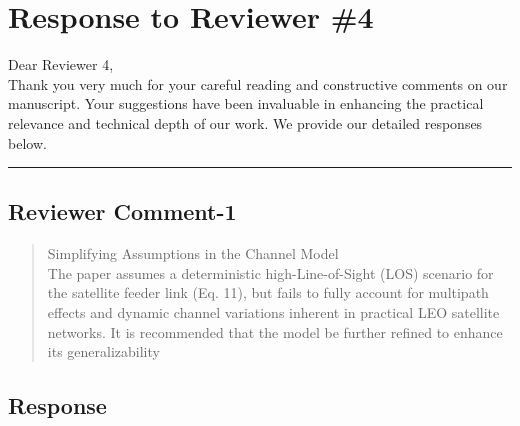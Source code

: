 \section{Response to Reviewer \#4}

Dear Reviewer 4,\\

Thank you very much for your careful reading and constructive comments on our manuscript. Your suggestions have been invaluable in enhancing the practical relevance and technical depth of our work. We provide our detailed responses below.

\noindent\rule{17cm}{2.0pt}


\subsection{Reviewer Comment-1}



\begin{mdframed}
\begin{quote}
Simplifying Assumptions in the Channel Model \\
   The paper assumes a deterministic high-Line-of-Sight (LOS) scenario for the satellite feeder link (Eq. 11), but fails to fully account for multipath effects and dynamic channel variations inherent in practical LEO satellite networks. It is recommended that the model be further refined to enhance its generalizability


\end{quote}

\end{mdframed}


\subsection{Response}


